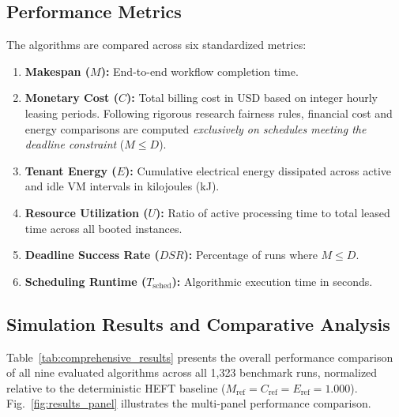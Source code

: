 \documentclass[journal]{IEEEtran}
\begin{document}
\subsection{Performance Metrics}
The algorithms are compared across six standardized metrics:
\begin{enumerate}
    \item \textbf{Makespan ($M$):} End-to-end workflow completion time.
    \item \textbf{Monetary Cost ($C$):} Total billing cost in USD based on integer hourly leasing periods. Following rigorous research fairness rules, financial cost and energy comparisons are computed \textit{exclusively on schedules meeting the deadline constraint} ($M \le D$).
    \item \textbf{Tenant Energy ($E$):} Cumulative electrical energy dissipated across active and idle VM intervals in kilojoules (kJ).
    \item \textbf{Resource Utilization ($U$):} Ratio of active processing time to total leased time across all booted instances.
    \item \textbf{Deadline Success Rate ($DSR$):} Percentage of runs where $M \le D$.
    \item \textbf{Scheduling Runtime ($T_{\text{sched}}$):} Algorithmic execution time in seconds.
\end{enumerate}

\subsection{Simulation Results and Comparative Analysis}
Table~\ref{tab:comprehensive_results} presents the overall performance comparison of all nine evaluated algorithms across all 1,323 benchmark runs, normalized relative to the deterministic HEFT baseline ($M_{\text{ref}} = C_{\text{ref}} = E_{\text{ref}} = 1.000$). Fig.~\ref{fig:results_panel} illustrates the multi-panel performance comparison.
\end{document}
